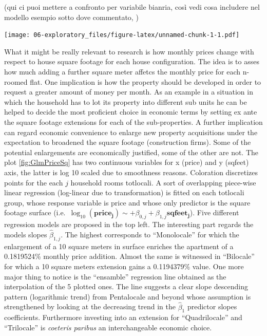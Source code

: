 \documentclass[
  12pt,
  a4paper,
  oneside]{book}
\theoremstyle{definition}
\theoremstyle{definition}
\theoremstyle{definition}
\theoremstyle{remark}
\begin{document}
(qui ci puoi mettere a confronto per variabile bianria, così vedi cosa includere nel modello esempio sotto dove commentato, )

\texttt{[image: 06-exploratory\_files/figure-latex/unnamed-chunk-1-1.pdf]}

What it might be really relevant to research is how monthly prices change with respect to house square footage for each house configuration. The idea is to asses how much adding a further square meter affetcs the monthly price for each n-roomed flat.
One implication is how the property should be developed in order to request a greater amount of money per month. As an example in a situation in which the household has to lot its property into different sub units he can be helped to decide the most proficient choice in economic terms by setting ex ante the square footage extensions for each of the sub-properties.
A further implication can regard economic convenience to enlarge new property acquisitions under the expectation to broadened the square footage (construction firms). Some of the potential enlargements are economically justified, some of the other are not.
The plot \ref{fig:GlmPriceSq} has two continuous variables for x (price) and y (sqfeet) axis, the latter is log 10 scaled due to smoothness reasons. Coloration discretizes points for the each \(j\) household rooms totlocali. A sort of overlapping piece-wise linear regression (log-linear due to transformation) is fitted on each totlocali group, whose response variable is price and whose only predictor is the square footage surface (i.e.~\(\log_{10}(\mathbf{price_j}) \sim +\beta_{0,j}+\beta_{1,j}\mathbf{sqfeet_j}\)). Five different regression models are proposed in the top left. The interesting part regards the models slopes \(\hat\beta_{1,j}\). The highest corresponds to ``Monolocale'' for which the enlargement of a 10 square meters in surface enriches the apartment of a 0.1819524\% monthly price addition. Almost the same is witnessed in ``Bilocale'' for which a 10 square meters extension gains a 0.1194379\% value. One more major thing to notice is the ``ensamble'' regression line obtained as the interpolation of the 5 plotted ones. The line suggests a clear slope descending pattern (logarithmic trend) from Pentalocale and beyond whose assumption is strengthened by looking at the decreasing trend in the \(\hat\beta_1\) predictor slopes coefficients. Furthermore investing into an extension for ``Quadrilocale'' and ``Trilocale'' is \emph{coeteris paribus} an interchangeable economic choice.
\end{document}
